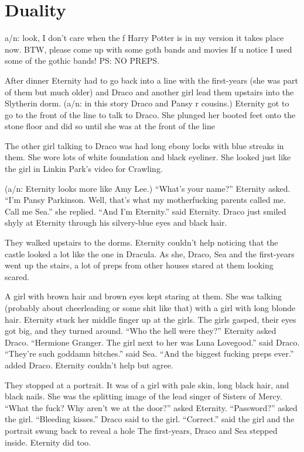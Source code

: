 \section{Duality}

a/n: look, I don't care when the f Harry Potter is in my version it takes place now. BTW, please come up with some goth bands and movies If u notice I used some of the gothic bands! PS: NO PREPS.

After dinner Eternity had to go back into a line with the first-years (she was part of them but much older) and Draco and another girl lead them upstairs into the Slytherin dorm. (a/n: in this story Draco and Pansy r cousins.) Eternity got to go to the front of the line to talk to Draco. She plunged her booted feet onto the stone floor and did so until she was at the front of the line

The other girl talking to Draco was had long ebony locks with blue streaks in them. She wore lots of white foundation and black eyeliner. She looked just like the girl in Linkin Park's video for Crawling.

(a/n: Eternity looks more like Amy Lee.) \enquote{What's your name?} Eternity asked. \enquote{I'm Pansy Parkinson. Well, that's what my motherfucking parents called me. Call me Sea.} she replied. \enquote{And I'm Eternity.} said Eternity. Draco just smiled shyly at Eternity through his silvery-blue eyes and black hair.

They walked upstairs to the dorms. Eternity couldn't help noticing that the castle looked a lot like the one in Dracula. As she, Draco, Sea and the first-years went up the stairs, a lot of preps from other houses stared at them looking scared.

A girl with brown hair and brown eyes kept staring at them. She was talking (probably about cheerleading or some shit like that) with a girl with long blonde hair. Eternity stuck her middle finger up at the girls. The girls gasped, their eyes got big, and they turned around. \enquote{Who the hell were they?} Eternity asked Draco. \enquote{Hermione Granger. The girl next to her was Luna Lovegood.} said Draco. \enquote{They're such goddamn bitches.} said Sea. \enquote{And the biggest fucking preps ever.} added Draco. Eternity couldn't help but agree.

They stopped at a portrait. It was of a girl with pale skin, long black hair, and black nails. She was the splitting image of the lead singer of Sisters of Mercy. \enquote{What the fuck? Why aren't we at the door?} asked Eternity. \enquote{Password?} asked the girl. \enquote{Bleeding kisses.} Draco said to the girl. \enquote{Correct.} said the girl and the portrait swung back to reveal a hole The first-years, Draco and Sea stepped inside. Eternity did too.

